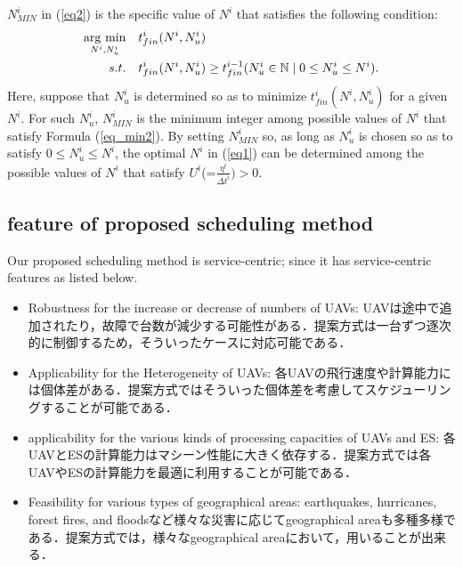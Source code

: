 \documentclass{ieeeaccess}
\newcommand{\argmin}{\mathop{\rm arg~min}\limits}
\begin{document}
$N_{MIN}^i$ in (\ref{eq2}) is the specific value of $N^i$ that satisfies the following condition:
%
\begin{align}
\argmin_{N^i,N_u^i} \quad& {t_{fin}^i(N^i,N_u^i)}\label{eq_min1}\\
s.t. \quad& {t_{fin}^i(N^i,N_u^i)}\geq{t_{fin}^{i-1}}({N_u^i}\in \mathbb{N}\mid 0\leq{N_u^i}\leq{N^i}). \label{eq_min2}
\end{align}
%
Here, suppose that ${N_u^i}$ is determined so as to minimize $t_{fin}^i(N^i,N_u^i)$ for a given $N^i$.
%
For such ${N_u^i}$, $N_{MIN}^i$ is the minimum integer among possible values of $N^i$ that satisfy Formula (\ref{eq_min2}).
%
By setting $N_{MIN}^i$ so, as long as ${N_u^i}$ is chosen so as to satisfy $0\leq{N_u^i}\leq{N^i}$, the optimal $N^i$ in (\ref{eq1}) can be determined among the possible values of $N^i$ that satisfy $U^i$(=$\frac{\eta^{i}}{{\Delta{t}}^i}) > 0$.

\color{black}
\subsection{feature of proposed scheduling method}

Our proposed scheduling method is service-centric; since it has service-centric features as listed below.
\begin{itemize}
\item Robustness for the increase or decrease of numbers of UAVs: UAVは途中で追加されたり，故障で台数が減少する可能性がある．提案方式は一台ずつ逐次的に制御するため，そういったケースに対応可能である．
\item Applicability for the Heterogeneity of UAVs: 各UAVの飛行速度や計算能力には個体差がある．提案方式ではそういった個体差を考慮してスケジューリングすることが可能である．
\item applicability for the various kinds of processing capacities of UAVs and ES: 各UAVとESの計算能力はマシーン性能に大きく依存する．提案方式では各UAVやESの計算能力を最適に利用することが可能である．
\item Feasibility for various types of geographical areas: earthquakes, hurricanes, forest fires, and floodsなど様々な災害に応じてgeographical areaも多種多様である．提案方式では，様々なgeographical areaにおいて，用いることが出来る．
\end{itemize}
\end{document}
